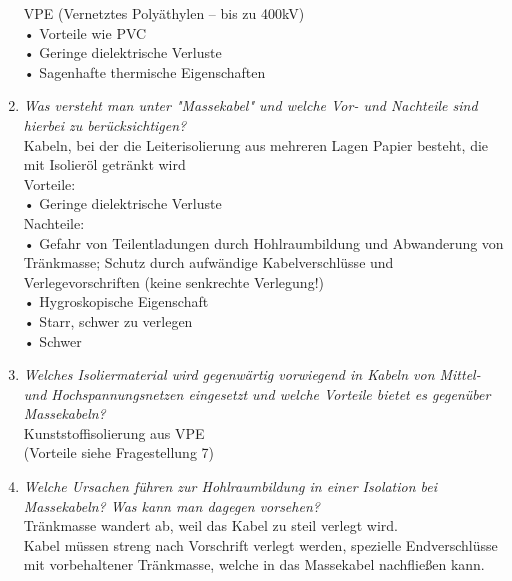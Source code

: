 \documentclass[12pt]{article}
\begin{document}
\begin{enumerate}
    VPE (Vernetztes Polyäthylen – bis zu 400kV)\\
    • Vorteile wie PVC\\
    • Geringe dielektrische Verluste\\
    • Sagenhafte thermische Eigenschaften\\
    \item \textit{Was versteht man unter "Massekabel" und welche 
    Vor- und Nachteile sind hierbei zu berücksichtigen?}\\
    Kabeln, bei der die Leiterisolierung aus mehreren Lagen Papier besteht, die mit Isolieröl getränkt wird\\
    Vorteile:\\
    • Geringe dielektrische Verluste\\
    Nachteile: \\
    • Gefahr von Teilentladungen durch Hohlraumbildung und Abwanderung von Tränkmasse; Schutz durch aufwändige Kabelverschlüsse und Verlegevorschriften (keine senkrechte Verlegung!)\\
    • Hygroskopische Eigenschaft\\
    • Starr, schwer zu verlegen\\
    • Schwer\\
    \item \textit{Welches Isoliermaterial wird gegenwärtig 
    vorwiegend in Kabeln von Mittel- und 
    Hochspannungsnetzen eingesetzt und welche 
    Vorteile bietet es gegenüber Massekabeln?}\\
    Kunststoffisolierung aus VPE  \\
    (Vorteile siehe Fragestellung 7)
    

    \item \textit{Welche Ursachen führen zur Hohlraumbildung in 
    einer Isolation bei Massekabeln? Was kann man 
    dagegen vorsehen?}\\ 
    Tränkmasse wandert ab, weil das Kabel zu steil verlegt wird. \\
    Kabel müssen streng nach Vorschrift verlegt werden, spezielle Endverschlüsse mit vorbehaltener Tränkmasse, welche in das Massekabel nachfließen kann.


\end{enumerate}
\end{document}
